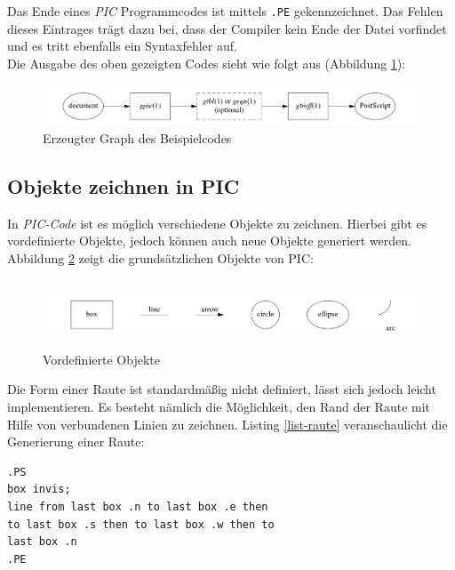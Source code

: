 \noindent
Das Ende eines \textit{PIC} Programmcodes ist mittels \verb|.PE| gekennzeichnet. Das Fehlen dieses Eintrages trägt dazu bei, dass der Compiler kein Ende der Datei vorfindet und es tritt ebenfalls ein Syntaxfehler auf.
\\

\noindent
Die Ausgabe des oben gezeigten Codes sieht wie folgt aus (Abbildung \ref{Erg_Beispielcode_1})\footnotemark[13]:
\\
\begin{figure}[H]
	\begin{center}
		\includegraphics[width=13cm]{images/Ergebnis_1.png}
		\caption{Erzeugter Graph des Beispielcodes}
		\label{Erg_Beispielcode_1}
	\end{center}
\end{figure}

\subsection{Objekte zeichnen in PIC}

\noindent
In \textit{PIC-Code} ist es möglich verschiedene Objekte zu zeichnen. Hierbei gibt es vordefinierte Objekte, jedoch können auch neue Objekte generiert werden.
\\

\noindent
Abbildung \ref{Objekte_PIC}  zeigt die grundsätzlichen Objekte von PIC:
\\
\begin{figure}[H]
	\begin{center}
		\includegraphics[width=13cm, height=2cm]{images/Objekte_PIC.png}
		\caption{Vordefinierte Objekte}
		\label{Objekte_PIC}
	\end{center}
\end{figure}

\pra

\noindent
Die Form einer Raute ist standardmäßig nicht definiert, lässt sich jedoch leicht implementieren. Es besteht nämlich die Möglichkeit, den Rand der Raute mit Hilfe von verbundenen Linien zu zeichnen. Listing \ref{list-raute} veranschaulicht die Generierung einer Raute:
\\
\noindent
\lstset{frame=lines}
\lstset{basicstyle=\footnotesize}
\begin{lstlisting}
.PS
box invis;
line from last box .n to last box .e then
to last box .s then to last box .w then to
last box .n
.PE
\end{lstlisting}

